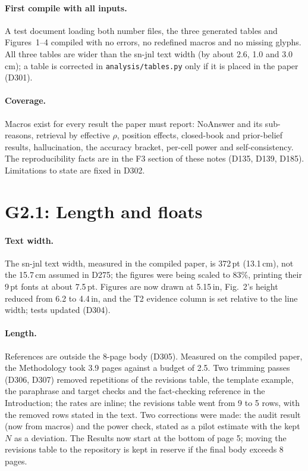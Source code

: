 \documentclass[11pt,a4paper]{report}
\begin{document}
\paragraph{First compile with all inputs.} A test document loading both number files, the three generated
tables and Figures~1--4 compiled with no errors, no redefined macros and no missing glyphs. All three tables
are wider than the sn-jnl text width (by about 2.6, 1.0 and 3.0\,cm); a table is corrected in
\texttt{analysis/tables.py} only if it is placed in the paper (D301).

\paragraph{Coverage.} Macros exist for every result the paper must report: NoAnswer and its sub-reasons,
retrieval by effective $\rho$, position effects, closed-book and prior-belief results, hallucination, the
accuracy bracket, per-cell power and self-consistency. The reproducibility facts are in the F3 section of
these notes (D135, D139, D185). Limitations to state are fixed in D302.

\section{G2.1: Length and floats}

\paragraph{Text width.} The sn-jnl text width, measured in the compiled paper, is 372\,pt (13.1\,cm), not the
15.7\,cm assumed in D275; the figures were being scaled to 83\%, printing their 9\,pt fonts at about 7.5\,pt.
Figures are now drawn at 5.15\,in, Fig.~2's height reduced from 6.2 to 4.4\,in, and the T2 evidence column is set
relative to the line width; tests updated (D304).

\paragraph{Length.} References are outside the 8-page body (D305). Measured on the compiled paper, the
Methodology took 3.9 pages against a budget of 2.5. Two trimming passes (D306, D307) removed repetitions of
the revisions table, the template example, the paraphrase and target checks and the fact-checking reference
in the Introduction; the rates are inline; the revisions table went from 9 to 5 rows, with the removed rows
stated in the text. Two corrections were made: the audit result (now from macros) and the power check, stated
as a pilot estimate with the kept $N$ as a deviation. The Results now start at the bottom of page 5; moving the
revisions table to the repository is kept in reserve if the final body exceeds 8 pages.
\end{document}
